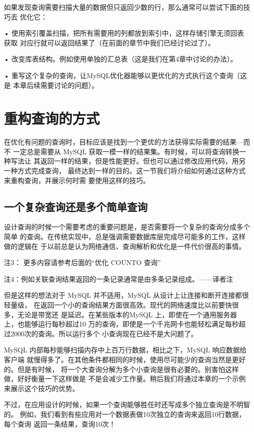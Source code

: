 如果发现查询需要扫描大量的数据但只返回少数的行，那么通常可以尝试下面的技巧去
优化它：

• 使用索引覆盖扫描，把所有需要用的列都放到索引中，这样存储引擎无须回表获取
对应行就可以返回结果了（在前面的章节中我们已经讨论过了）。

• 改变库表结构。例如使用单独的汇总表（这是我们在第4章中讨论的办法）。

• 重写这个复杂的查询，让MySQL优化器能够以更优化的方式执行这个查询（这是
本章后续需要讨论的问题）。

\section{重构查询的方式}
在优化有问题的查询时，目标应该是找到一个更优的方法获得实际需要的结果—而不
一定总是需要从 MySQL 获取一模一样的结果集。有时候，可以将查询转换一种写法让
其返回一样的结果，但是性能更好。但也可以通过修改应用代码，用另一种方式完成查询，
最终达到一样的目的。这一节我们将介绍如何通过这种方式来重构查询，并展示何时需
要使用这样的技巧。

\subsection{一个复杂查询还是多个简单查询}
设计查询的时候一个需要考虑的重要问题是，是否需要将一个复杂的查询分成多个简单
的查询。在传统实现中，总是强调需要数据库层完成尽可能多的工作，这样做的逻辑在
于以前总是认为网络通信、查询解析和优化是一件代价很高的事情。

注3： 更多内容请参考后面的“优化 COUNTO 查询”

注4：例如关联查询结果返回的一条记录通常是由多条记录组成。——译者注

但是这样的想法对于 MySQL 并不适用，MySQL 从设计上让连接和断开连接都很轻量级，
在返回一个小的查询结果方面很高效。现代的网络速度比以前要快很多，无论是带宽还
是延迟。在某些版本的MySQL 上，即使在一个通用服务器上，也能够运行每秒超过10
万的查询，即使是一个千兆网卡也能轻松满足每秒超过2000次的查询。所以运行多个
小查询现在已经不是大问题了。

MySQL 内部每秒能够扫描内存中上百万行数据，相比之下，MySQL 响应数据给客户端
就慢得多了。在其他条件都相同的时候，使用尽可能少的查询当然是更好的。但是有时候，
将一个大查询分解为多个小查询是很有必要的。别害怕这样做，好好衡量一下这样做是
不是会减少工作量。稍后我们将通过本章的一个示例来展示这个技巧的优势。

不过，在应用设计的时候，如果一个查询能够胜任时还写成多个独立查询是不明智的。
例如，我们看到有些应用对一个数据表做10次独立的查询来返回10行数据，每个查询
返回一条结果，查询10次！

